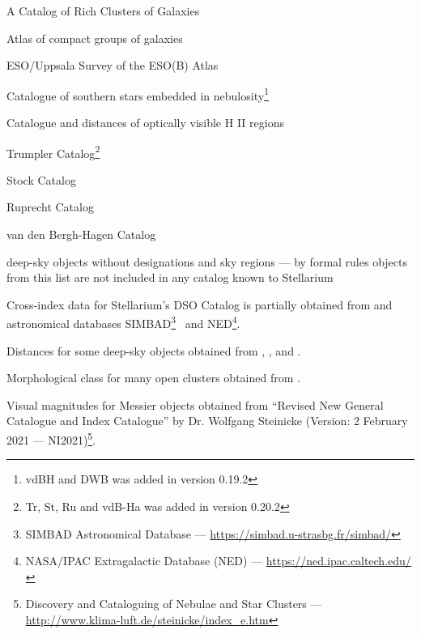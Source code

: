 \begin{description}[align=right,labelwidth=2cm]
\item[\textbf{Abell}]  A Catalog of Rich Clusters of Galaxies~\citep{1989ApJS...70....1A}
\item[\textbf{HCG}]  Atlas of compact groups of galaxies~\citep{1993ApL....29....1H}
\item[\textbf{ESO}]  ESO/Uppsala Survey of the ESO(B) Atlas~\citep{1982ESO...C......0L}
\item[\textbf{vdBH}]  Catalogue of southern stars embedded in nebulosity\footnote{vdBH and DWB was added in version 0.19.2}~\citep{1975AJ.....80..208V}
\item[\textbf{DWB}]  Catalogue and distances of optically visible H II regions~\citep{1969A&A.....1..270D}
\item[\textbf{Tr}]  Trumpler Catalog\footnote{Tr, St, Ru and vdB-Ha was added in version 0.20.2}
\item[\textbf{St}]  Stock Catalog
\item[\textbf{Ru}]  Ruprecht Catalog
\item[\textbf{vdB-Ha}]  van den Bergh-Hagen Catalog~\citep{1975AJ.....80...11V}
\item[\textbf{Other}] deep-sky objects without designations and sky regions --- by formal rules objects from this list are not included in any catalog known to Stellarium
\end{description}

\noindent Cross-index data for Stellarium's DSO Catalog is partially obtained from 
 and astronomical databases 
SIMBAD\footnote{SIMBAD Astronomical Database --- \url{https://simbad.u-strasbg.fr/simbad/}}~\citep{2000A&AS..143....9W} 
and NED\footnote{NASA/IPAC Extragalactic Database (NED) --- \url{https://ned.ipac.caltech.edu/}}.

\noindent Distances for some deep-sky objects obtained from , ,  and .

\noindent Morphological class for many open clusters obtained from .

\noindent Visual magnitudes for Messier objects obtained from ``Revised New General Catalogue and Index Catalogue'' by Dr. Wolfgang Steinicke (Version: 2 February 2021 --- NI2021)\footnote{Discovery and Cataloguing of Nebulae and Star Clusters --- \url{http://www.klima-luft.de/steinicke/index_e.htm}}.

